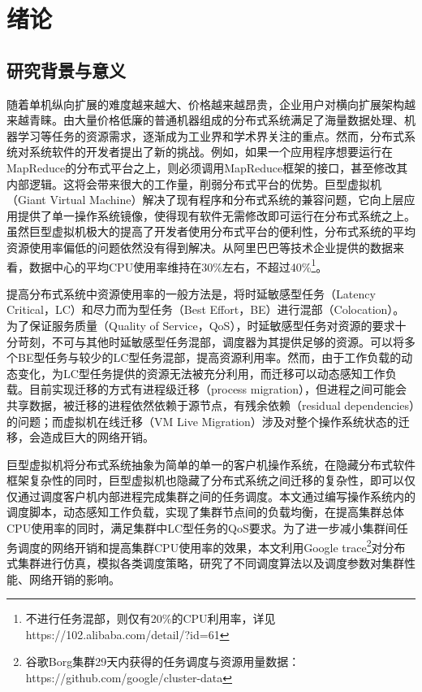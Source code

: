 
\chapter{绪论}
\label{chap:Intro}
\section{研究背景与意义}
随着单机纵向扩展的难度越来越大、价格越来越昂贵，企业用户对横向扩展架构越来越青睐。由大量价格低廉的普通机器组成的分布式系统满足了海量数据处理、机器学习等任务的资源需求，逐渐成为工业界和学术界关注的重点。然而，分布式系统对系统软件的开发者提出了新的挑战。例如，如果一个应用程序想要运行在MapReduce\cite{MapReduce}的分布式平台之上，则必须调用MapReduce框架的接口，甚至修改其内部逻辑。这将会带来很大的工作量，削弱分布式平台的优势。巨型虚拟机（Giant Virtual Machine）\cite{giantvm}解决了现有程序和分布式系统的兼容问题，它向上层应用提供了单一操作系统镜像，使得现有软件无需修改即可运行在分布式系统之上。虽然巨型虚拟机极大的提高了开发者使用分布式平台的便利性，分布式系统的平均资源使用率偏低的问题依然没有得到解决。从阿里巴巴等技术企业提供的数据来看，数据中心的平均CPU使用率维持在30\%左右，不超过40\%\footnote{不进行任务混部，则仅有20\%的CPU利用率，详见https://102.alibaba.com/detail/?id=61}。

提高分布式系统中资源使用率的一般方法是，将时延敏感型任务（Latency Critical，LC）和尽力而为型任务（Best Effort，BE）进行混部（Colocation）。为了保证服务质量（Quality of Service，QoS），时延敏感型任务对资源的要求十分苛刻，不可与其他时延敏感型任务混部，调度器为其提供足够的资源。可以将多个BE型任务与较少的LC型任务混部，提高资源利用率。然而，由于工作负载的动态变化，为LC型任务提供的资源无法被充分利用，而迁移可以动态感知工作负载。目前实现迁移的方式有进程级迁移（process migration），但进程之间可能会共享数据，被迁移的进程依然依赖于源节点，有残余依赖（residual dependencies）\cite{residual}的问题；而虚拟机在线迁移（VM Live Migration）\cite{livemigration}涉及对整个操作系统状态的迁移，会造成巨大的网络开销。

巨型虚拟机将分布式系统抽象为简单的单一的客户机操作系统，在隐藏分布式软件框架复杂性的同时，巨型虚拟机也隐藏了分布式系统之间迁移的复杂性，即可以仅仅通过调度客户机内部进程完成集群之间的任务调度。本文通过编写操作系统内的调度脚本，动态感知工作负载，实现了集群节点间的负载均衡，在提高集群总体CPU使用率的同时，满足集群中LC型任务的QoS要求。为了进一步减小集群间任务调度的网络开销和提高集群CPU使用率的效果，本文利用Google trace\footnote{谷歌Borg集群29天内获得的任务调度与资源用量数据：https://github.com/google/cluster-data}对分布式集群进行仿真，模拟各类调度策略，研究了不同调度算法以及调度参数对集群性能、网络开销的影响。

